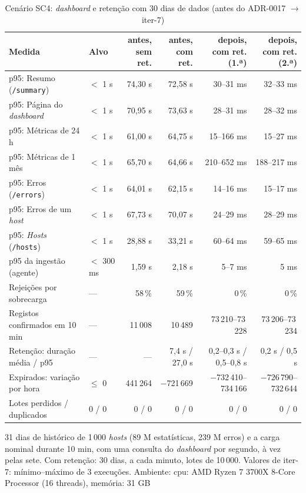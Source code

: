 \begin{table}[htbp]
  \centering\small
  \caption{Cenário SC4: \emph{dashboard} e retenção com 30 dias de dados (antes do ADR-0017 $\rightarrow$ iter-7)}
  \label{tab:carga-sc4}
  \begin{tabularx}{\linewidth}{>{\raggedright\arraybackslash}Xlrrrr}
    \toprule
    Medida & Alvo & \makecell[r]{antes,\\ sem ret.} & \makecell[r]{antes,\\ com ret.} & \makecell[r]{depois,\\ com ret. (1.ª)} & \makecell[r]{depois,\\ com ret. (2.ª)} \\
    \midrule
    p95: Resumo (\texttt{/summary}) & $<$ 1 s & 74,30 s & 72,58 s & 30--31 ms & 32--33 ms \\
    p95: Página do \emph{dashboard} & $<$ 1 s & 70,95 s & 73,63 s & 28--31 ms & 28--32 ms \\
    p95: Métricas de 24 h & $<$ 1 s & 61,00 s & 64,75 s & 15--166 ms & 15--27 ms \\
    p95: Métricas de 1 mês & $<$ 1 s & 65,70 s & 64,66 s & 210--652 ms & 188--217 ms \\
    p95: Erros (\texttt{/errors}) & $<$ 1 s & 64,01 s & 62,15 s & 14--16 ms & 15--17 ms \\
    p95: Erros de um \emph{host} & $<$ 1 s & 67,73 s & 70,07 s & 24--29 ms & 28--29 ms \\
    p95: \emph{Hosts} (\texttt{/hosts}) & $<$ 1 s & 28,88 s & 33,21 s & 60--64 ms & 59--65 ms \\
    p95 da ingestão (agente) & $<$ 300 ms & 1,59 s & 2,18 s & 5--7 ms & 5 ms \\
    Rejeições por sobrecarga & --- & 58\,\% & 59\,\% & 0\,\% & 0\,\% \\
    Registos confirmados em 10 min & --- & 11\,008 & 10\,489 & 73\,210--73\,228 & 73\,206--73\,234 \\
    Retenção: duração média / p95 & --- & --- & 7,4 s / 27,0 s & 0,2--0,3 s / 0,5--0,8 s & 0,2 s / 0,5 s \\
    Expirados: variação por hora & $\le$ 0 & 441\,264 & $-$721\,669 & $-$732\,410--734\,166 & $-$726\,790--732\,644 \\
    Lotes perdidos / duplicados & 0 / 0 & 0 / 0 & 0 / 0 & 0 / 0 & 0 / 0 \\
    \bottomrule
  \end{tabularx}
  \par\smallskip\footnotesize 31 dias de histórico de 1\,000 \emph{hosts} (89 M estatísticas, 239 M erros) e a carga nominal durante 10 min, com uma consulta do \emph{dashboard} por segundo, à vez pelas sete. Com retenção: 30 dias, a cada minuto, lotes de 10\,000. Valores de iter-7: mínimo--máximo de 3 execuções. Ambiente: cpu: AMD Ryzen 7 3700X 8-Core Processor (16 threads), memória: 31 GB
\end{table}
